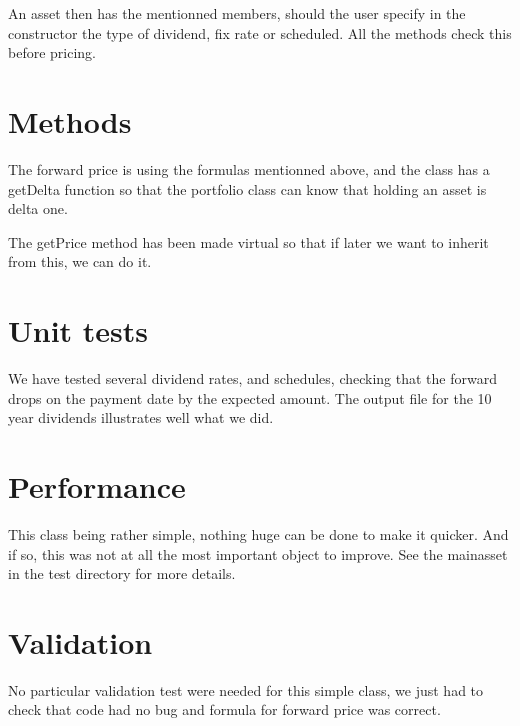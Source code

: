 An asset then has the mentionned members, should the user specify in the constructor the type of dividend, fix rate or scheduled. All the methods check this before pricing.


\section{Methods}

\par The forward price is using the formulas mentionned above, and the class has a getDelta function so that the portfolio class can know that holding an asset is delta one.

\par The getPrice method has been made virtual so that if later we want to inherit from this, we can do it.

\section{Unit tests}

\par We have tested several dividend rates, and schedules, checking that the forward drops on the payment date by the expected amount. The output file for the 10 year dividends illustrates well what we did.

\section{Performance}

\par This class being rather simple, nothing huge can be done to make it quicker. And if so, this was not at all the most important object to improve. See the mainasset in the test directory for more details.


\section{Validation}
No particular validation test were needed for this simple class, we just had to check that code had no bug and formula for forward price was correct.

